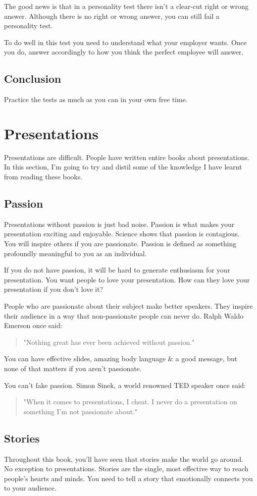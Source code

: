 \documentclass{article}
\begin{document}
The good news is that in a personality test there isn't a clear-cut
right or wrong answer. Although there is no right or wrong answer, you
can still fail a personality test.

To do well in this test you need to understand what your employer wants.
Once you do, answer accordingly to how you think the perfect employee
will answer.
\subsection{Conclusion}
Practice the tests as much as you can in your own free time.
\section{Presentations}
Presentations are difficult. People have written entire books about
presentations. In this section, I'm going to try and distil some of the
knowledge I have learnt from reading these books.
\subsection{Passion}
Presentations without passion is just bad noise. Passion is what makes
your presentation exciting and enjoyable. Science shows that passion is
contagious. You will inspire others if you are passionate. Passion is
defined as something profoundly meaningful to you as an individual.

If you do not have passion, it will be hard to generate enthusiasm for
your presentation. You want people to love your presentation. How can
they love your presentation if you don't love it?

People who are passionate about their subject make better speakers. They
inspire their audience in a way that non-passionate people can never do.
Ralph Waldo Emerson once said:
\begin{quote}
    "Nothing great has ever been achieved without passion."
\end{quote}
You can have effective slides, amazing body language \& a good message,
but none of that matters if you aren't passionate.

You can't fake passion. Simon Sinek, a world renowned TED speaker once
said:
\begin{quote}
    "When it comes to presentations, I cheat. I never do a presentation on
something I'm not passionate about."
\end{quote}
\subsection{Stories}
Throughout this book, you'll have seen that stories make the world go
around. No exception to presentations. Stories are the single, most
effective way to reach people's hearts and minds. You need to tell a
story that emotionally connects you to your audience.
\end{document}
